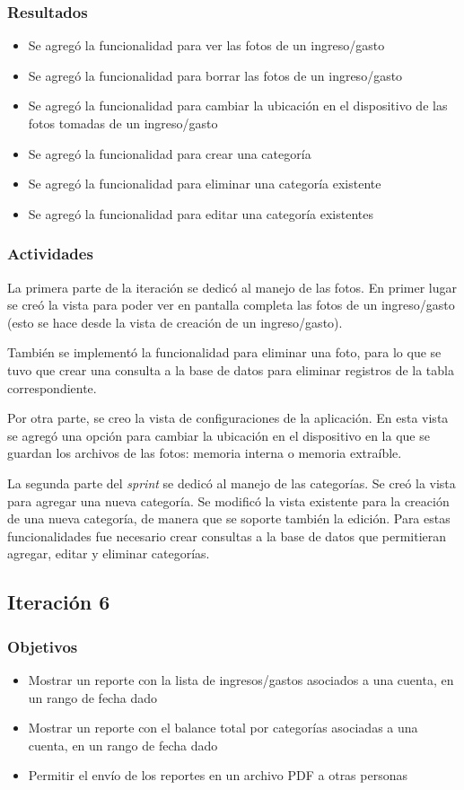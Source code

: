 \subsubsection{Resultados}
\begin{itemize}
\item Se agregó la funcionalidad para ver las fotos de un ingreso/gasto
\item Se agregó la funcionalidad para borrar las fotos de un ingreso/gasto
\item Se agregó la funcionalidad para cambiar la ubicación en el dispositivo de las fotos tomadas de un ingreso/gasto
\item Se agregó la funcionalidad para crear una categoría
\item Se agregó la funcionalidad para eliminar una categoría existente
\item Se agregó la funcionalidad para editar una categoría existentes
\end{itemize}

\subsubsection{Actividades}
La primera parte de la iteración se dedicó al manejo de las fotos. En primer lugar se creó la vista para poder ver en pantalla completa las fotos de un ingreso/gasto (esto se hace desde la vista de creación de un ingreso/gasto). 

También se implementó la funcionalidad para eliminar una foto, para lo que se tuvo que crear una consulta a la base de datos para eliminar registros de la tabla correspondiente.

Por otra parte, se creo la vista de configuraciones de la aplicación. En esta vista se agregó una opción para cambiar la ubicación en el dispositivo en la que se guardan los archivos de las fotos: memoria interna o memoria extraíble.

La segunda parte del \textit{sprint} se dedicó al manejo de las categorías. Se creó la vista para agregar una nueva categoría. Se modificó la vista existente para la creación de una nueva categoría, de manera que se soporte también la edición. Para estas funcionalidades fue necesario crear consultas a la base de datos que permitieran agregar, editar y eliminar categorías.

\subsection{Iteración 6}
\subsubsection{Objetivos}
\begin{itemize}
\item Mostrar un reporte con la lista de ingresos/gastos asociados a una cuenta, en un rango de fecha dado
\item Mostrar un reporte con el balance total por categorías asociadas a una cuenta, en un rango de fecha dado
\item Permitir el envío de los reportes en un archivo PDF a otras personas

\end{itemize}

